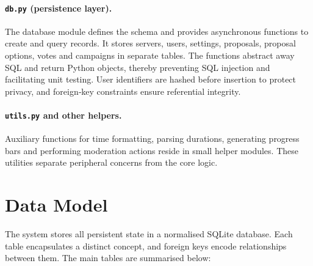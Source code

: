 \paragraph{\texttt{db.py} (persistence layer).}
The database module defines the schema and provides asynchronous
functions to create and query records.  It stores servers, users,
settings, proposals, proposal options, votes and campaigns in separate
tables.  The functions abstract away SQL and return Python objects,
thereby preventing SQL injection and facilitating unit testing.  User
identifiers are hashed before insertion to protect privacy, and
foreign‑key constraints ensure referential integrity.

\paragraph{\texttt{utils.py} and other helpers.}
Auxiliary functions for time formatting, parsing durations, generating
progress bars and performing moderation actions reside in small helper
modules.  These utilities separate peripheral concerns from the core
logic.

\section{Data Model}

The system stores all persistent state in a normalised SQLite
database.  Each table encapsulates a distinct concept, and foreign keys
encode relationships between them.  The main tables are summarised
below:

